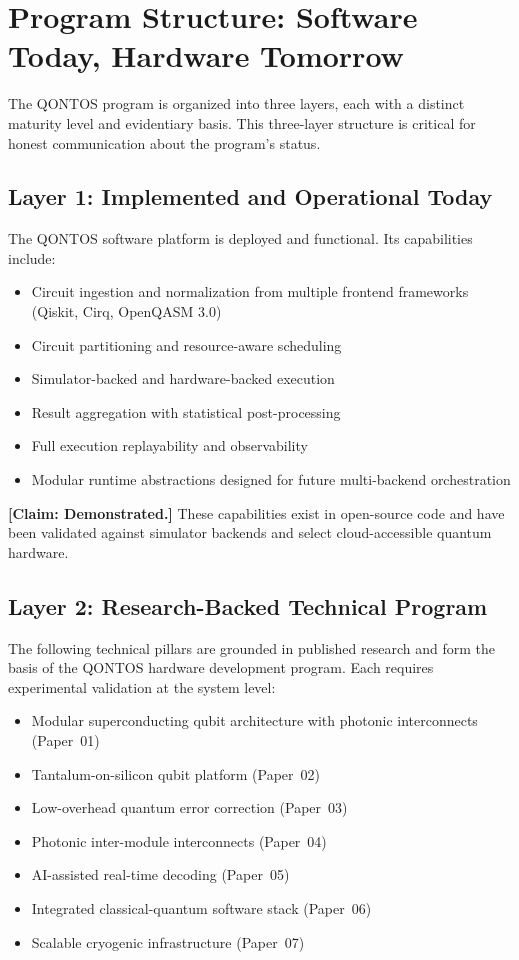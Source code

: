 \documentclass[conference]{IEEEtran}
\begin{document}
\section{Program Structure: Software Today, Hardware Tomorrow}

The QONTOS program is organized into three layers, each with a distinct maturity level and evidentiary basis. This three-layer structure is critical for honest communication about the program's status.

\subsection{Layer 1: Implemented and Operational Today}

The QONTOS software platform is deployed and functional. Its capabilities include:

\begin{itemize}
\item Circuit ingestion and normalization from multiple frontend frameworks (Qiskit, Cirq, OpenQASM 3.0)
\item Circuit partitioning and resource-aware scheduling
\item Simulator-backed and hardware-backed execution
\item Result aggregation with statistical post-processing
\item Full execution replayability and observability
\item Modular runtime abstractions designed for future multi-backend orchestration
\end{itemize}

\textbf{[Claim: Demonstrated.]} These capabilities exist in open-source code and have been validated against simulator backends and select cloud-accessible quantum hardware.

\subsection{Layer 2: Research-Backed Technical Program}

The following technical pillars are grounded in published research and form the basis of the QONTOS hardware development program. Each requires experimental validation at the system level:

\begin{itemize}
\item Modular superconducting qubit architecture with photonic interconnects (Paper~01)
\item Tantalum-on-silicon qubit platform (Paper~02)
\item Low-overhead quantum error correction (Paper~03)
\item Photonic inter-module interconnects (Paper~04)
\item AI-assisted real-time decoding (Paper~05)
\item Integrated classical-quantum software stack (Paper~06)
\item Scalable cryogenic infrastructure (Paper~07)
\end{itemize}
\end{document}
